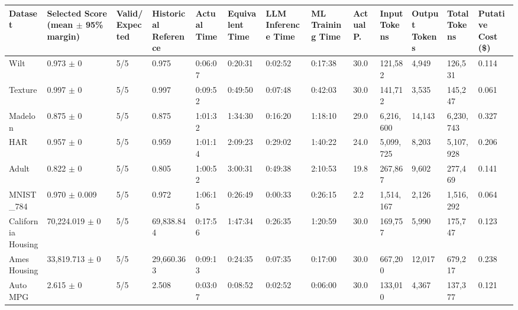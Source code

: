 \begin{tabular}{lllllllllllll}
\hline
Dataset & Selected Score (mean \ensuremath{\pm} 95\% margin) & Valid/Expected & Historical Reference & Actual Time & Equivalent Time & LLM Inference Time & ML Training Time & Actual P. & Input Tokens & Output Tokens & Total Tokens & Putative Cost (\$) \\
\hline
Wilt & 0.973 \ensuremath{\pm} 0 & 5/5 & 0.975 & 0:06:07 & 0:20:31 & 0:02:52 & 0:17:38 & 30.0 & 121,582 & 4,949 & 126,531 & 0.114 \\
Texture & 0.997 \ensuremath{\pm} 0 & 5/5 & 0.997 & 0:09:52 & 0:49:50 & 0:07:48 & 0:42:03 & 30.0 & 141,712 & 3,535 & 145,247 & 0.061 \\
Madelon & 0.875 \ensuremath{\pm} 0 & 5/5 & 0.875 & 1:01:32 & 1:34:30 & 0:16:20 & 1:18:10 & 29.0 & 6,216,600 & 14,143 & 6,230,743 & 0.327 \\
HAR & 0.957 \ensuremath{\pm} 0 & 5/5 & 0.959 & 1:01:14 & 2:09:23 & 0:29:02 & 1:40:22 & 24.0 & 5,099,725 & 8,203 & 5,107,928 & 0.206 \\
Adult & 0.822 \ensuremath{\pm} 0 & 5/5 & 0.805 & 1:00:52 & 3:00:31 & 0:49:38 & 2:10:53 & 19.8 & 267,867 & 9,602 & 277,469 & 0.141 \\
MNIST\_784 & 0.970 \ensuremath{\pm} 0.009 & 5/5 & 0.972 & 1:06:15 & 0:26:49 & 0:00:33 & 0:26:15 & 2.2 & 1,514,167 & 2,126 & 1,516,292 & 0.064 \\
California Housing & 70,224.019 \ensuremath{\pm} 0 & 5/5 & 69,838.844 & 0:17:56 & 1:47:34 & 0:26:35 & 1:20:59 & 30.0 & 169,757 & 5,990 & 175,747 & 0.123 \\
Ames Housing & 33,819.713 \ensuremath{\pm} 0 & 5/5 & 29,660.363 & 0:09:13 & 0:24:35 & 0:07:35 & 0:17:00 & 30.0 & 667,200 & 12,017 & 679,217 & 0.238 \\
Auto MPG & 2.615 \ensuremath{\pm} 0 & 5/5 & 2.508 & 0:03:07 & 0:08:52 & 0:02:52 & 0:06:00 & 30.0 & 133,010 & 4,367 & 137,377 & 0.121 \\
\hline
\end{tabular}
